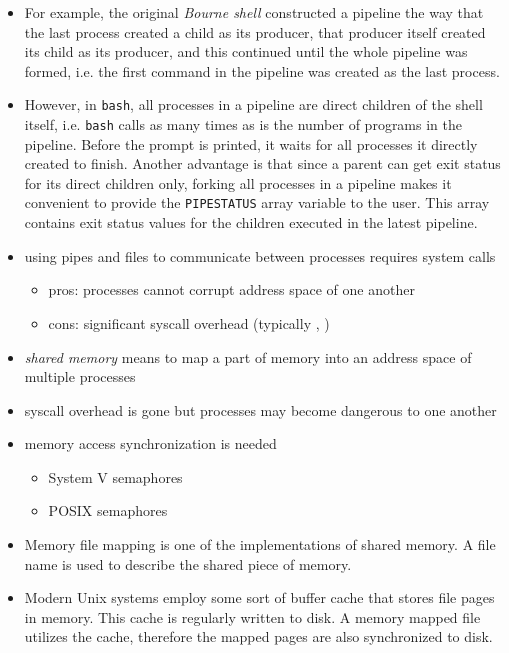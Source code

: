 \begin{itemize}
itself to sleep: \texttt{date | sleep 10 | cat}.
\item For example, the original \emph{Bourne shell} constructed a pipeline the
way that the last process created a child as its producer, that producer itself
created its child as its producer, and this continued until the whole pipeline
was formed, i.e. the first command in the pipeline was created as the last
process.
\item However, in \texttt{bash}, all processes in a pipeline are direct children
of the shell itself, i.e. \texttt{bash} calls  as many times as is
the number of programs in the pipeline.  Before the prompt is printed, it waits
for all processes it directly created to finish.  Another advantage is that
since a parent can get exit status for its direct children only, forking all
processes in a pipeline makes it convenient to provide the \texttt{PIPESTATUS}
array variable to the user. This array contains exit status values for the
children executed in the latest pipeline.
\end{itemize}


\begin{slide}
\begin{itemize}
\item using pipes and files to communicate between processes requires system
calls
\begin{itemize}
\item pros: processes cannot corrupt address space of one another
\item cons: significant syscall overhead (typically ,
)
\end{itemize}
\item \emph{shared memory} means to map a part of memory into an address space
of multiple processes
\item syscall overhead is gone but processes may become dangerous to one another
\item memory access synchronization is needed
\begin{itemize}
  \item System V semaphores
  \item POSIX semaphores
\end{itemize}
\end{itemize}
\end{slide}

\begin{itemize}
\item Memory file mapping is one of the implementations of shared memory.
A file name is used to describe the shared piece of memory.
\item Modern Unix systems employ some sort of buffer cache that stores
file pages in memory. This cache is regularly written to disk.
A memory mapped file utilizes the cache, therefore the mapped pages
are also synchronized to disk.
\end{itemize}

